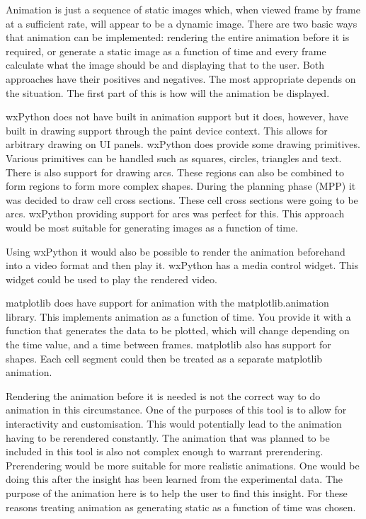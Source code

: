 Animation is just a sequence of static images which, when viewed frame by frame at a sufficient rate, will appear to be a dynamic image.  There are two basic ways that animation can be implemented: rendering the entire animation before it is required, or generate a static image as a function of time and every frame calculate what the image should be and displaying that to the user.  Both approaches have their positives and negatives.  The most appropriate depends on the situation.  The first part of this is how will the animation be displayed.

wxPython does not have built in animation support but it does, however, have built in drawing support through the paint device context.  This allows for arbitrary drawing on \ac{UI} panels.  wxPython does provide some drawing primitives.  Various primitives can be handled such as squares, circles, triangles and text.  There is also support for drawing arcs.  These regions can also be combined to form regions to form more complex shapes.  During the planning phase (MPP) it was decided to draw cell cross sections.  These cell cross sections were going to be arcs.  wxPython providing support for arcs was perfect for this.  This approach would be most suitable for generating images as a function of time.

Using wxPython it would also be possible to render the animation beforehand into a video format and then play it.  wxPython has a media control widget.  This widget could be used to play the rendered video.

matplotlib does have support for animation with the matplotlib.animation library.  This implements animation as a function of time.  You provide it with a function that generates the data to be plotted, which will change depending on the time value, and a time between frames.  matplotlib also has support for shapes.  Each cell segment could then be treated as a separate matplotlib animation.

Rendering the animation before it is needed is not the correct way to do animation in this circumstance.  One of the purposes of this tool is to allow for interactivity and customisation.  This would potentially lead to the animation having to be rerendered constantly.  The animation that was planned to be included in this tool is also not complex enough to warrant prerendering.  Prerendering would be more suitable for more realistic animations.  One would be doing this after the insight has been learned from the experimental data.  The purpose of the animation here is to help the user to find this insight.  For these reasons treating animation as generating static as a function of time was chosen.

